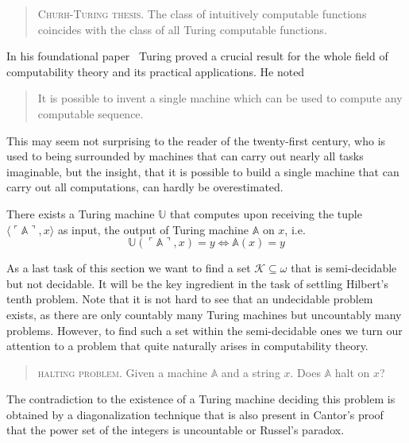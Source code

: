 \begin{quote}
  \textsc{Churh-Turing thesis.} The class of intuitively computable
  functions coincides with the class of all Turing computable functions.
\end{quote}

In his foundational paper~\cite{Turing1936} Turing proved a crucial result for
the whole field of computability theory and its practical applications. He noted
\begin{quote}
  It is possible to invent a single machine which can be used to compute any
  computable sequence.
\end{quote}
This may seem not surprising to the reader of the twenty-first century, who is
used to being surrounded by machines that can carry out nearly all tasks
imaginable, but the insight, that it is possible to build a single machine that
can carry out all computations, can hardly be overestimated.

\begin{thm}
    There exists a Turing machine \(\mathbb U\) that computes upon receiving
    the tuple \(⟨\ulcorner \mathbb A \urcorner, x⟩\) as input, the output of
    Turing machine \(\mathbb A\) on \(x\), i.e.
    \[
      \mathbb U(\ulcorner \mathbb A \urcorner, x) = y \Leftrightarrow
        \mathbb A (x) = y
    \]
\end{thm}

As a last task of this section we want to find a set \(\mathcal{K} \subseteq ω\)
that is semi-decidable but not decidable. It will be the key ingredient in the
task of settling Hilbert's tenth problem. Note that it is not hard to see that
an undecidable problem exists, as there are only countably many Turing machines
but uncountably many problems. However, to find such a set within the
semi-decidable ones we turn our attention to a problem that quite naturally
arises in computability theory.
\begin{quote}
  \textsc{halting problem.} Given a machine \(\mathbb A\) and a string \(x\). Does
  \(\mathbb A\) halt on \(x\)?
\end{quote}
The contradiction to the existence of a Turing machine deciding this problem is
obtained by a diagonalization technique that is also present in Cantor's proof
that the power set of the integers is uncountable or Russel's paradox.


